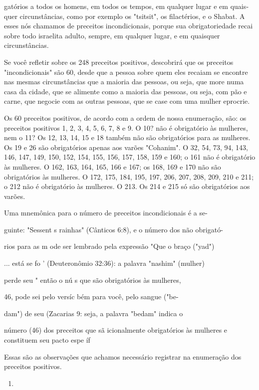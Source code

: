 \begin{itemize}
\begin{enumrate}
\begin{itemize}
\begin{itemize}
\begin{itemize}
gatórios a todos os homens, em todos os tempos, em qualquer lugar e em
quais­quer circunstâncias, como por exemplo os "tsitsit", os
filactérios, e o Shabat. A esses nós chamamos de preceitos
incondicionais, porque sua obrigatorieda­de recai sobre todo israelita
adulto, sempre, em qualquer lugar, e em quaisquer circunstâncias.

Se você refletir sobre os 248 preceitos positivos, descobrirá que os
preceitos "incondicionais" são 60, desde que a pessoa sobre quem eles
recaiam se encontre nas mesmas circunstâncias que a maioria das pessoas,
ou seja, que more numa casa da cidade, que se alimente como a maioria
das pessoas, ou seja, com pão e carne, que negocie com as outras
pessoas, que se case com uma mulher eprocrie.

Os 60 preceitos positivos, de acordo com a ordem de nossa enume­ração,
são: os preceitos positivos 1, 2, 3, 4, 5, 6, 7, 8 e 9. O 10? não é
obrigató­rio às mulheres, nem o 11? Os 12, 13, 14, 15 e 18 também não
são obrigatórios para as mulheres. Os 19 e 26 são obrigatórios apenas
aos varões "Cohanim". O 32, 54, 73, 94, 143, 146, 147, 149, 150, 152,
154, 155, 156, 157, 158, 159 e 160; o 161 não é obrigatório às mulheres.
O 162, 163, 164, 165, 166 e 167; os 168, 169 e 170 não são obrigatórios
às mulheres. O 172, 175, 184, 195, 197, 206, 207, 208, 209, 210 e 211; o
212 não é obrigatório às mulheres. O 213. Os 214 e 215 só são
obrigatórios aos varões.


Uma mnemônica para o número de preceitos incondicionais é a se-


guinte: "Sessent s rainhas" (Cânticos 6:8), e o número dos não obrigató-

rios para as m ode ser lembrado pela expressão "Que o braço ("yad")

... está se fo ' (Deuteronômio 32:36): a palavra "nashim" (mulher)

perde seu " então o nú s que são obrigatórios às mulheres,

46, pode sei pelo versíc bém para você, pelo sangue ("be-

dam") de seu (Zacarias 9: seja, a palavra "bedam" indica o

número (46) dos preceitos que sã icionalmente obrigatórios às mulheres
e constituem seu pacto espe íf

Essas são as observações que achamos necessário registrar na enu­meração
dos preceitos positivos.


\begin{enumerate}
\def\labelenumi{\arabic{enumi}.}
\setcounter{enumi}{230}
\item
 

\end{enumerate}
\end{itemize}
\end{itemize}
\end{itemize}
\end{enumrate}
\end{itemize}
